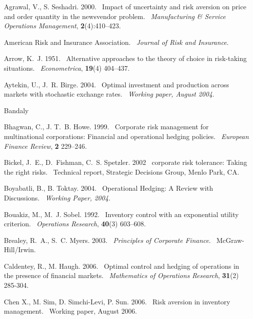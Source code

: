 \documentclass[mnsc,nonblindrev,copyedit]{informs2_wz} %
\def\newblock{\ }%
\begin{document}

\begin{thebibliography}{1}

Agrawal, V., S. Seshadri. 2000.
\newblock Impact of uncertainty and risk aversion on price and order quantity
  in the newsvendor problem.
\newblock {\em Manufacturing \& Service Operations Management}, {\bf 2}(4):410--423.

American Risk and Insurance Association.
\newblock {\em Journal of Risk and Insurance}.

Arrow, K.~J. 1951.
\newblock Alternative approaches to the theory of choice in risk-taking
  situations.
\newblock {\em Econometrica}, {\bf 19}(4) 404--437.

Aytekin, U., J.~R. Birge. 2004.
\newblock Optimal investment and production across markets with stochastic
  exchange rates.
\newblock {\em Working paper, August 2004}.




Bandaly

Bhagwan, C., J. T.~B. Howe. 1999.
\newblock Corporate risk management for multinational corporations: Financial
  and operational hedging policies.
\newblock {\em European Finance Review}, {\bf 2} 229--246.



Bickel, J.~E., D.~Fishman, C.~S. Spetzler. 2002
\newblock corporate risk tolerance: Taking the right risks.
\newblock Technical report, Strategic Decisions Group, Menlo Park, CA.

Boyabatli, B., B. Toktay. 2004.
\newblock {Operational Hedging:  A Review with Discussions.}
\newblock {\em Working Paper, 2004.}

Bouakiz, M., M.~J. Sobel. 1992.
\newblock Inventory control with an exponential utility criterion.
\newblock {\em Operations Research}, {\bf 40}(3) 603--608.

Brealey, R.~A., S.~C. Myers. 2003.
\newblock {\em Principles of Corporate Finance}.
\newblock McGraw-Hill/Irwin.

Caldentey, R., M. Haugh. 2006.
\newblock Optimal control and hedging of operations in the presence of
  financial markets.
\newblock {\em Mathematics of Operations Research}, {\bf 31}(2) 285-304.

Chen X., M. Sim, D. Simchi-Levi, P. Sun. 2006.
\newblock Risk aversion in inventory management.
\newblock Working paper, August 2006.



\end{thebibliography}
\end{document}
